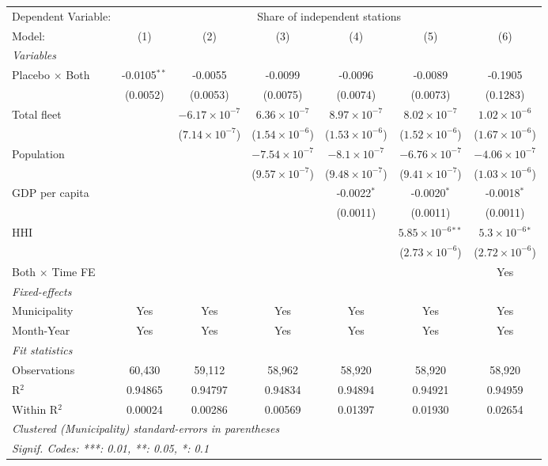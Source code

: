\documentclass[
]{article}
\begin{document}
\begin{tabular}{lcccccc}
\tabularnewline\midrule\midrule
Dependent Variable:&\multicolumn{6}{c}{Share of independent stations}\\
Model:&(1) & (2) & (3) & (4) & (5) & (6)\\
\midrule \emph{Variables}&   &   &   &   &   &  \\
Placebo $\times $ Both & -0.0105$^{**}$ & -0.0055 & -0.0099 & -0.0096 & -0.0089 & -0.1905\\
  &(0.0052) & (0.0053) & (0.0075) & (0.0074) & (0.0073) & (0.1283)\\
Total fleet &    & $-6.17\times 10^{-7}$ & $6.36\times 10^{-7}$ & $8.97\times 10^{-7}$ & $8.02\times 10^{-7}$ & $1.02\times 10^{-6}$\\
  &   & ($7.14\times 10^{-7}$) & ($1.54\times 10^{-6}$) & ($1.53\times 10^{-6}$) & ($1.52\times 10^{-6}$) & ($1.67\times 10^{-6}$)\\
Population &    &    & $-7.54\times 10^{-7}$ & $-8.1\times 10^{-7}$ & $-6.76\times 10^{-7}$ & $-4.06\times 10^{-7}$\\
  &   &    & ($9.57\times 10^{-7}$) & ($9.48\times 10^{-7}$) & ($9.41\times 10^{-7}$) & ($1.03\times 10^{-6}$)\\
GDP per capita &    &    &    & -0.0022$^{*}$ & -0.0020$^{*}$ & -0.0018$^{*}$\\
  &   &    &    & (0.0011) & (0.0011) & (0.0011)\\
HHI &    &    &    &    & $5.85\times 10^{-6}$$^{**}$ & $5.3\times 10^{-6}$$^{*}$\\
  &   &    &    &    & ($2.73\times 10^{-6}$) & ($2.72\times 10^{-6}$)\\
Both $\times$ Time FE &  &  &  &  &  & Yes\\
\midrule \emph{Fixed-effects}&   &   &   &   &   &  \\
Municipality & Yes & Yes & Yes & Yes & Yes & Yes\\
Month-Year & Yes & Yes & Yes & Yes & Yes & Yes\\
\midrule \emph{Fit statistics}&  & & & & & \\
Observations & 60,430&59,112&58,962&58,920&58,920&58,920\\
R$^2$ & 0.94865&0.94797&0.94834&0.94894&0.94921&0.94959\\
Within R$^2$ & 0.00024&0.00286&0.00569&0.01397&0.01930&0.02654\\
\midrule\midrule\multicolumn{7}{l}{\emph{Clustered (Municipality) standard-errors in parentheses}}\\
\multicolumn{7}{l}{\emph{Signif. Codes: ***: 0.01, **: 0.05, *: 0.1}}\\
\end{tabular}
\end{document}
